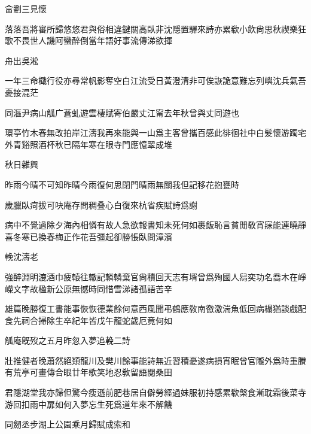 \documentclass{zhvt-classic-Miya}
\begin{document}
\begin{fw}畣劉三見懷\end{fw}

落落吾將審所歸悠悠君與俗相違鍵關高臥非沈隱置驛來詩亦累欷小飲尙思秋禊樂狂歌不畏世人譏阿蠻醉倒當年語好事流傳涕欲揮

\begin{fw}舟出吳淞\end{fw}

一年三命檝行役亦尋常帆影奪空白江流受日黃澄清非可俟詼詭意難忘列嶼沈兵氣吾憂接混茫

\begin{fw}同漚尹病山觚广蒼虬遊雲棲賦寄伯嚴丈江甯去年秋曾與丈同遊也\end{fw}

環亭竹木春無改拍岸江濤我再來能與一山爲主客曾攜百感此徘徊社中白髮懷游躅宅外青谿照酒杯秋已隔年寒在眼寺門應憶翠成堆

\begin{fw}秋日雜興\end{fw}

昨雨今晴不可知昨晴今雨復何思閉門晴雨無關我但記移花抱甕時

\begin{fw}歲臘臥疴拔可吷庵存問稠叠心白復來杭省疾賦詩爲謝\end{fw}

病中不覺過除夕海內相憐有故人急欲報書知未死何如裹飯恥言貧閒敎宵寐能連曉靜喜冬寒已換春梅正作花吾彊起卻勝悵臥問漳濱

\begin{fw}輓沈濤老\end{fw}

強醉淵明漉酒巾疲轅往轍記轔轔棄官尙積回天志有壻曾爲殉國人舄奕功名喬木在崢嶸文字故楹新公原無憾時同惜雪涕諸孤語苦辛

雄篇晚勝復工書能事恢恢德業餘何意西風聞弔鶴應敎南徼激湍魚低回病榻猶談戲配食先祠合掃除生卒紀年皆戊午龍蛇歲厄竟何如

\begin{fw}觚庵旣歿之五月昨忽入夢追輓二詩\end{fw}

壯推健者晚蕭然絕類龍川及樊川餘事能詩無近習積憂遂病損宵眠曾官隴外爲時重賸有荒亭可畫傳合眼廿年歌笑地忍敎留語閱桑田

君隱湖堂我亦歸但驚今瘦遜前肥巷居自僻勞經過妹服初持感累欷槃食漸耽霜後菜寺游回扣雨中扉如何入夢忘生死爲道年來不解饑

\begin{fw}同劒丞步湖上公園乘月歸賦成索和\end{fw}
\end{document}
